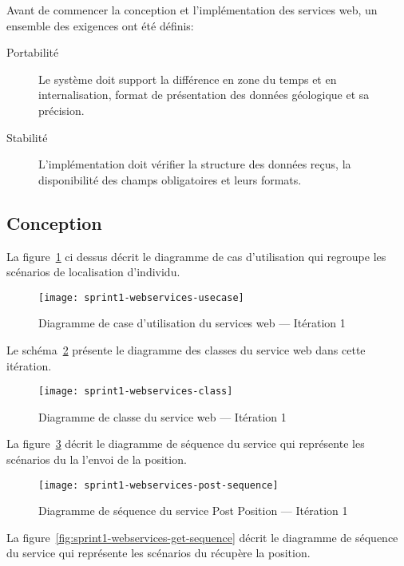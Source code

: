 Avant de commencer la conception et l'implémentation des services web, un
ensemble des exigences ont été définis:

\begin{description}
    \item [Portabilité] Le système doit support la différence en zone du temps
        et en internalisation, format de présentation des données géologique et
        sa précision.
    \item [Stabilité] L'implémentation doit vérifier la structure des données
        reçus, la disponibilité des champs obligatoires et leurs formats.
\end{description}


\subsection{Conception}

La figure~\ref{fig:sprint1-webservices-usecase} ci dessus décrit le diagramme
de cas d'utilisation qui regroupe les scénarios de localisation d'individu.

\begin{figure}[H]
    \centering
    \texttt{[image: sprint1-webservices-usecase]}
    \caption{Diagramme de case d'utilisation du services web --- Itération 1}
\label{fig:sprint1-webservices-usecase}
\end{figure}

Le schéma~\ref{fig:sprint1-webservices-class} présente le diagramme des classes
du service web dans cette itération.

\begin{figure}[htbp]
    \centering
    \texttt{[image: sprint1-webservices-class]}
    \caption{Diagramme de classe du service web --- Itération 1}
\label{fig:sprint1-webservices-class}
\end{figure}


La figure~\ref{fig:sprint1-webservices-post-sequence} décrit le diagramme de
séquence du service  qui représente les scénarios du la
l'envoi de la position.

\begin{figure}[H]
    \centering
    \texttt{[image: sprint1-webservices-post-sequence]}
    \caption{Diagramme de séquence du service Post Position --- Itération 1}
\label{fig:sprint1-webservices-post-sequence}
\end{figure}

La figure~\ref{fig:sprint1-webservices-get-sequence} décrit le diagramme de
séquence du service  qui représente les scénarios du
récupère la position.

